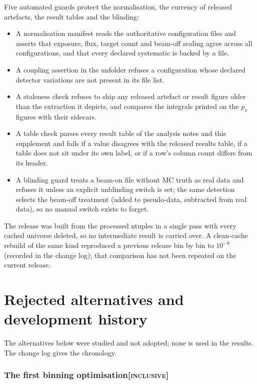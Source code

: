\documentclass[11pt,a4paper]{article}
\newcommand{\scopetag}[1]{\hfill{\normalfont\small\textsc{[#1]}}}
\begin{document}
Five automated guards protect the normalisation, the currency of released artefacts,
the result tables and the blinding:
\begin{itemize}\itemsep1pt
  \item A normalisation manifest reads the authoritative configuration files and asserts
    that exposure, flux, target count and beam-off scaling agree across all
    configurations, and that every declared systematic is backed by a file.
  \item A coupling assertion in the unfolder refuses a configuration whose declared
    detector variations are not present in its file list.
  \item A staleness check refuses to ship any released artefact or result figure older
    than the extraction it depicts, and compares the integrals printed on the $p_\pi$
    figures with their sidecars.
  \item A table check parses every result table of the analysis notes and this supplement and fails if a value
    disagrees with the released results table, if a table does not sit under its own
    label, or if a row's column count differs from its header.
  \item A blinding guard treats a beam-on file without MC truth as real data and refuses it
    unless an explicit unblinding switch is set; the same detection selects the beam-off
    treatment (added to pseudo-data, subtracted from real data), so no manual switch
    exists to forget.
\end{itemize}
The release was built from the processed ntuples in a single pass with every cached
universe deleted, so no intermediate result is carried over. A clean-cache rebuild of the
same kind reproduced a previous release bin by bin to $10^{-9}$ (recorded in the change
log); that comparison has not been repeated on the current release.




\part{Rejected alternatives and development history}
The alternatives below were studied and not adopted; none is used in the results. The change log gives the
chronology.

\section[The first binning optimisation]{The first binning optimisation\scopetag{inclusive}}
\label{sec:binopt}
\label{sec:binning_recheck}
\end{document}
